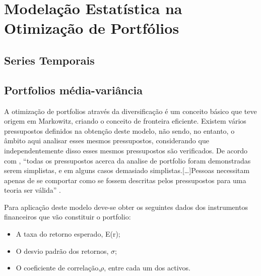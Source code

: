 \documentclass[
  12pt,
  brazil,
  a4paper,
  openany]{book}
\providecommand{\tightlist}{%
  \setlength{\itemsep}{0pt}\setlength{\parskip}{0pt}}
\begin{document}
\begingroup
\titleformat{\chapter}[display]
{\normalfont\huge\bfseries\centering}{\chaptertitlename\ \thechapter}{20pt}{\Huge}

\hypertarget{modelauxe7uxe3o-estatuxedstica-na-otimizauxe7uxe3o-de-portfuxf3lios}{%
\chapter{Modelação Estatística na Otimização de Portfólios}\label{modelauxe7uxe3o-estatuxedstica-na-otimizauxe7uxe3o-de-portfuxf3lios}}

\newpage

\hypertarget{series-temporais}{%
\section{Series Temporais}\label{series-temporais}}

\hypertarget{portfolios-muxe9dia-variuxe2ncia}{%
\section{Portfolios média-variância}\label{portfolios-muxe9dia-variuxe2ncia}}

A otimização de portfolios através da diversificação é um conceito básico que teve origem em Markowitz, criando o conceito de fronteira eficiente. Existem vários pressupostos definidos na obtenção deste modelo, não sendo, no entanto, o âmbito aqui analisar esses mesmos pressupostos, considerando que independentemente disso esses mesmos pressupostos são verificados. De acordo com \textcite{Modern2013}, ``todas os pressupostos acerca da analise de portfolio foram demonstradas serem simplistas, e em alguns casos demasiado simplistas.{[}\ldots{]}Pessoas necessitam apenas de se comportar como se fossem descritas pelos pressupostos para uma teoria ser válida'' \autocite[pp.5]{Modern2013}.

Para aplicação deste modelo deve-se obter os seguintes dados dos instrumentos financeiros que vão constituir o portfolio:

\begin{itemize}
\tightlist
\item
  A taxa do retorno esperado, E(r);
\item
  O desvio padrão dos retornos, \(\sigma\);
\item
  O coeficiente de correlação,\(\rho\), entre cada um dos activos.
\end{itemize}
\end{document}
